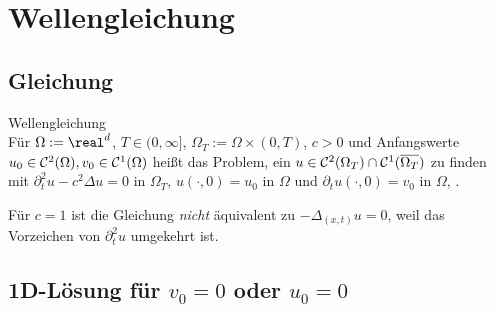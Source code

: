 \pagebreak

\section{%
    Wellengleichung%
}

\subsection{%
    Gleichung%
}

\begin{Def}{Wellengleichung}\\
    Für $\Omega := \real^d$, $T \in (0, \infty]$, $\Omega_T := \Omega \times (0, T)$,
    $c > 0$ und Anfangswerte $u_0 \in \mathcal{C}^2(\Omega), v_0 \in \mathcal{C}^1(\Omega)$ heißt
    das Problem, ein $u \in \mathcal{C}^2(\Omega_T) \cap \mathcal{C}^1(\overline{\Omega_T})$ zu finden mit
    $\partial_t^2 u - c^2 \Delta u = 0$ in $\Omega_T$,
    $u(\cdot, 0) = u_0$ in $\Omega$ und
    $\partial_t u(\cdot, 0) = v_0$ in $\Omega$,
    .
\end{Def}

\begin{Bem}
    Für $c = 1$ ist die Gleichung \emph{nicht} äquivalent zu $-\Delta_{(x,t)} u = 0$,
    weil das Vorzeichen von $\partial_t^2 u$ umgekehrt ist.
\end{Bem}

\subsection{%
    1D-Lösung für \texorpdfstring{$v_0 = 0$}{v₀ = 0} oder \texorpdfstring{$u_0 = 0$}{u₀ = 0}%
}

